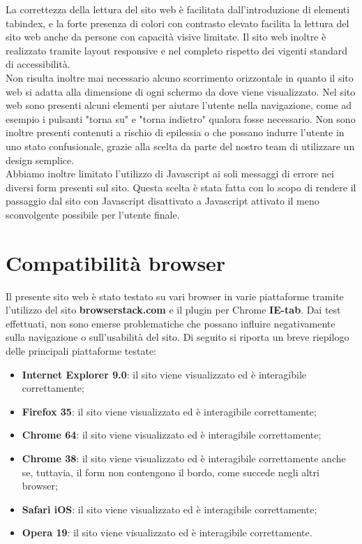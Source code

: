 La correttezza della lettura del sito web è facilitata dall'introduzione di elementi
tabindex, e la forte presenza di colori con contrasto elevato facilita la lettura del
sito web anche da persone con capacità visive limitate. Il sito web inoltre è realizzato 
tramite layout responsive e nel completo rispetto dei vigenti standard di
accessibilità.\\
Non risulta inoltre mai necessario alcuno scorrimento orizzontale in quanto il sito
web si adatta alla dimensione di ogni schermo da dove viene visualizzato. Nel
sito web sono presenti alcuni elementi per aiutare l'utente nella navigazione, come ad esempio i pulsanti "torna su" e "torna indietro" qualora fosse necessario. Non sono inoltre
presenti contenuti a rischio di epilessia o che possano indurre l'utente in uno stato
confusionale, grazie alla scelta da parte del nostro team di utilizzare un design semplice. \\
Abbiamo inoltre limitato l'utilizzo di Javascript ai soli messaggi di errore nei diversi form presenti sul sito. Questa scelta è stata fatta con lo scopo di rendere il passaggio dal sito con Javascript disattivato a Javascript attivato il meno sconvolgente possibile per l'utente finale.

\section{Compatibilità browser}

Il presente sito web è stato testato su vari browser in varie piattaforme tramite l'utilizzo del sito \textbf{browserstack.com} e il plugin per Chrome \textbf{IE-tab}. Dai test effettuati, non sono emerse problematiche che possano influire negativamente sulla navigazione o sull'usabilità del sito.
Di seguito si riporta un breve riepilogo delle principali piattaforme testate:
	\begin{itemize}
		\item \textbf{Internet Explorer 9.0}: il sito viene visualizzato ed è interagibile correttamente;
		\item \textbf{Firefox 35}: il sito viene visualizzato ed è interagibile correttamente;
		\item \textbf{Chrome 64}: il sito viene visualizzato ed è interagibile correttamente;
		\item \textbf{Chrome 38}: il sito viene visualizzato ed è interagibile correttamente anche se, tuttavia, il form non contengono il bordo, come succede negli altri browser;
		\item \textbf{Safari iOS}: il sito viene visualizzato ed è interagibile correttamente;
		\item \textbf{Opera 19}: il sito viene visualizzato ed è interagibile correttamente.
	\end{itemize}

